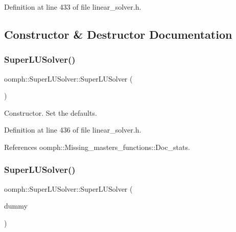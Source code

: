 Definition at line 433 of file linear\+\_\+solver.\+h.



\subsection{Constructor \& Destructor Documentation}
\mbox{\label{classoomph_1_1SuperLUSolver_a85a1b2227578d19db7cc5b36094ea07e}} 
\subsubsection{\texorpdfstring{Super\+L\+U\+Solver()}{SuperLUSolver()}\hspace{0.1cm}{\footnotesize\ttfamily [1/2]}}
{\footnotesize\ttfamily oomph\+::\+Super\+L\+U\+Solver\+::\+Super\+L\+U\+Solver (\begin{DoxyParamCaption}{ }\end{DoxyParamCaption})\hspace{0.3cm}{\ttfamily [inline]}}



Constructor. Set the defaults. 



Definition at line 436 of file linear\+\_\+solver.\+h.



References oomph\+::\+Missing\+\_\+masters\+\_\+functions\+::\+Doc\+\_\+stats.

\mbox{\label{classoomph_1_1SuperLUSolver_a863c22b3cb27f57aaeccb46c013ca4ce}} 
\subsubsection{\texorpdfstring{Super\+L\+U\+Solver()}{SuperLUSolver()}\hspace{0.1cm}{\footnotesize\ttfamily [2/2]}}
{\footnotesize\ttfamily oomph\+::\+Super\+L\+U\+Solver\+::\+Super\+L\+U\+Solver (\begin{DoxyParamCaption}\item[{const \hyperlink{classoomph_1_1SuperLUSolver}{Super\+L\+U\+Solver} \&}]{dummy }\end{DoxyParamCaption})\hspace{0.3cm}{\ttfamily [inline]}}



